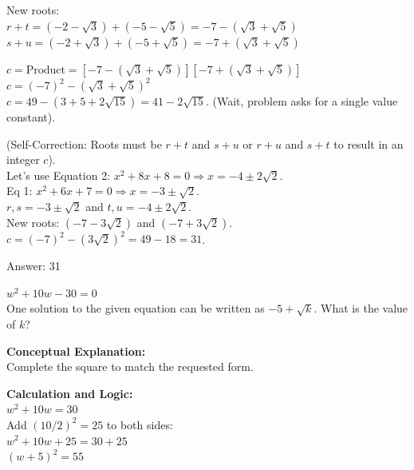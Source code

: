 \documentclass[11pt,paper=a4,answers]{exam}
\begin{document}
\begin{questions}
\begin{solution}
\vspace{10pt}

New roots: \\
$r+t = (-2-\sqrt{3}) + (-5-\sqrt{5}) = -7 - (\sqrt{3}+\sqrt{5})$ \\
$s+u = (-2+\sqrt{3}) + (-5+\sqrt{5}) = -7 + (\sqrt{3}+\sqrt{5})$

\vspace{10pt}

$c = \text{Product} = [-7 - (\sqrt{3}+\sqrt{5})][-7 + (\sqrt{3}+\sqrt{5})]$ \\
$c = (-7)^2 - (\sqrt{3}+\sqrt{5})^2$ \\
$c = 49 - (3 + 5 + 2\sqrt{15}) = 41 - 2\sqrt{15}$. (Wait, problem asks for a single value constant).

\vspace{10pt}

(Self-Correction: Roots must be $r+t$ and $s+u$ or $r+u$ and $s+t$ to result in an integer $c$). \\
Let's use Equation 2: $x^2 + 8x + 8 = 0 \Rightarrow x = -4 \pm 2\sqrt{2}$. \\
Eq 1: $x^2 + 6x + 7 = 0 \Rightarrow x = -3 \pm \sqrt{2}$. \\
$r, s = -3 \pm \sqrt{2}$ and $t, u = -4 \pm 2\sqrt{2}$. \\
New roots: $(-7 - 3\sqrt{2})$ and $(-7 + 3\sqrt{2})$. \\
$c = (-7)^2 - (3\sqrt{2})^2 = 49 - 18 = 31$.

\vspace{25pt}

Answer: \colorbox{yellow!100}{31}
\end{solution}

\vspace{40pt}

\question
$w^2 + 10w - 30 = 0$ \\
One solution to the given equation can be written as $-5 + \sqrt{k}$. What is the value of $k$?

\begin{solution}
\textbf{Conceptual Explanation:} \\
Complete the square to match the requested form.

\vspace{20pt}

\textbf{Calculation and Logic:} \\
$w^2 + 10w = 30$ \\
Add $(10/2)^2 = 25$ to both sides: \\
$w^2 + 10w + 25 = 30 + 25$ \\
$(w + 5)^2 = 55$


\end{solution}
\end{questions}
\end{document}
